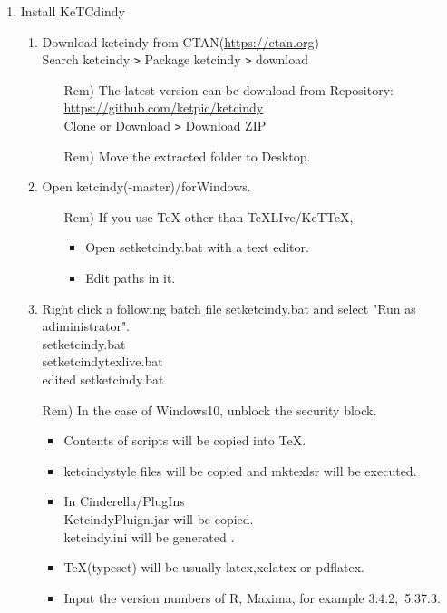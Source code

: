 \documentclass{article}
\begin{document}
\begin{enumerate}[\bf\large 1.]
\item Install KeTCdindy
  \begin{enumerate}[(1)]
  \item Download ketcindy from CTAN(\url{https://ctan.org})\\
  \hspace*{10mm}Search ketcindy \verb|>| Pack­age ketcindy \verb|>| download
    \begin{itemize}
    \item[Rem)]The latest version can be download from Repository:\\
        \hspace*{5mm}\url{https://github.com/ket­pic/ketcindy}\\
        \hspace*{10mm}Clone or Download \verb|>| Download ZIP
    \item[Rem)]Move the extracted folder to Desktop.
    \end{itemize}
  \item Open ketcindy(-master)/forWindows.
    \begin{itemize}
   \item[Rem)]If you use TeX other than TeXLIve/KeTTeX,
      \begin{itemize}
      \item Open setketcindy.bat with a text editor.
      \item Edit paths in it.
      \end{itemize}
    \end{itemize}
  \item Right click a following batch file setketcindy.bat and select "Run as adiministrator".\\
  \hspace*{10mm} setketcindy.bat\\
  \hspace*{10mm} setketcindytexlive.bat\\
  \hspace*{10mm} edited setketcindy.bat
   \item[Rem)]In the case of Windows10, unblock the security block.    \begin{itemize}
    \item Contents of scripts will be copied into TeX.
    \item ketcindystyle files will be copied and mktexlsr will be executed.
    \item In Cinderella/PlugIns\\
    \hspace*{5mm}KetcindyPluign.jar will be copied.\\
    \hspace*{5mm}ketcindy.ini will be generated .   
    \item TeX(typeset) will be usually latex,xelatex or pdflatex.
    \item Input the version numbers of R, Maxima, for example 3.4.2,\ 5.37.3.


\end{itemize}
\end{enumerate}
\end{enumerate}
\end{document}
